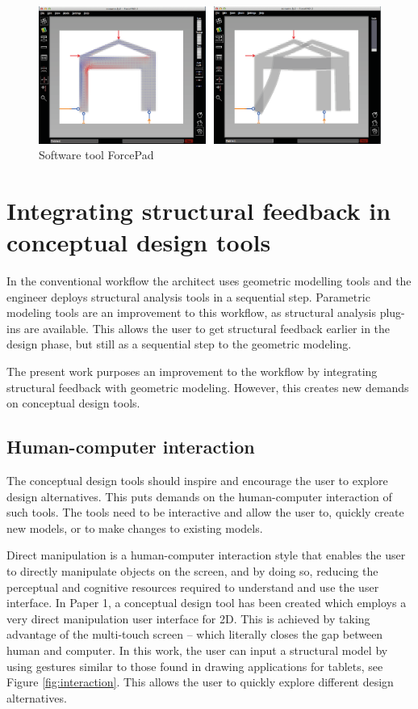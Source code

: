 \begin{figure}
  \includegraphics[width=350pt]{graphics/forcepad.png}
  \caption{Software tool ForcePad}
  \label{fig:forcepad}
\end{figure}


\chapter{Integrating structural feedback in conceptual design tools}
\label{ch:Integrating structural feedback}
In the conventional workflow the architect uses geometric modelling tools and the engineer deploys structural analysis tools in a sequential step. Parametric modeling tools are an improvement to this workflow, as structural analysis plug-ins are available. This allows the user to get structural feedback earlier in the design phase, but still as a sequential step to the geometric modeling.

The present work purposes an improvement to the workflow by integrating structural feedback with geometric modeling. However, this creates new demands on conceptual design tools. 

\section{Human-computer interaction}
The conceptual design tools should inspire and encourage the user to explore design alternatives. This puts demands on the human-computer interaction of such tools. The tools need to be interactive and allow the user to, quickly create new models, or to make changes to existing models. 

Direct manipulation is a human-computer interaction style that enables the user to directly manipulate objects on the screen, and by doing so, reducing the perceptual and cognitive resources required to understand and use the user interface. In Paper 1, a conceptual design tool has been created which employs a very direct manipulation user interface for 2D. This is achieved by taking advantage of the multi-touch screen – which literally closes the gap between human and computer. In this work, the user can input a structural model by using gestures similar to those found in drawing applications for tablets, see Figure \ref{fig:interaction}. This allows the user to quickly explore different design alternatives.

